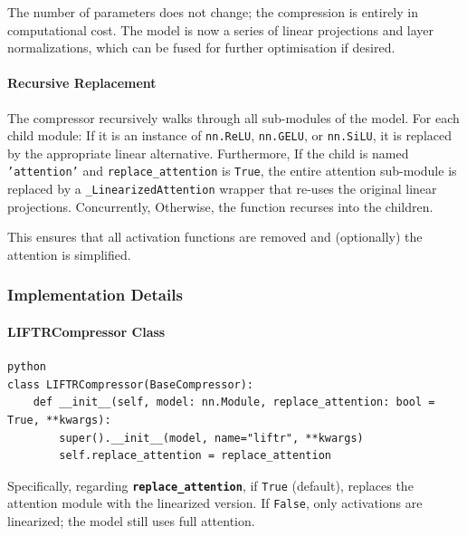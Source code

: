The number of parameters does not change; the compression is entirely in computational cost. The model is now a series of linear projections and layer normalizations, which can be fused for further optimisation if desired.

\paragraph{Recursive Replacement}

The compressor recursively walks through all sub-modules of the model. For each child module:
If it is an instance of \texttt{nn.ReLU}, \texttt{nn.GELU}, or \texttt{nn.SiLU}, it is replaced by the appropriate linear alternative. Furthermore, If the child is named \texttt{'attention'} and \texttt{replace\_attention} is \texttt{True}, the entire attention sub-module is replaced by a \texttt{\_LinearizedAttention} wrapper that re-uses the original linear projections. Concurrently, Otherwise, the function recurses into the children.


This ensures that all activation functions are removed and (optionally) the attention is simplified.


\subsubsection*{Implementation Details}

\paragraph{LIFTRCompressor Class}

\vspace{0.5em}
\begin{mdframed}[backgroundcolor=codebg, linecolor=codeframe, linewidth=1pt, roundcorner=4pt, innerleftmargin=2pt, innerrightmargin=5pt, innertopmargin=5pt, innerbottommargin=5pt]
\begin{lstlisting}
python
class LIFTRCompressor(BaseCompressor):
    def __init__(self, model: nn.Module, replace_attention: bool = True, **kwargs):
        super().__init__(model, name="liftr", **kwargs)
        self.replace_attention = replace_attention
\end{lstlisting}
\end{mdframed}
\vspace{0.5em}

Specifically, regarding \textbf{\texttt{replace\_attention}}, if \texttt{True} (default), replaces the attention module with the linearized version. If \texttt{False}, only activations are linearized; the model still uses full attention.


